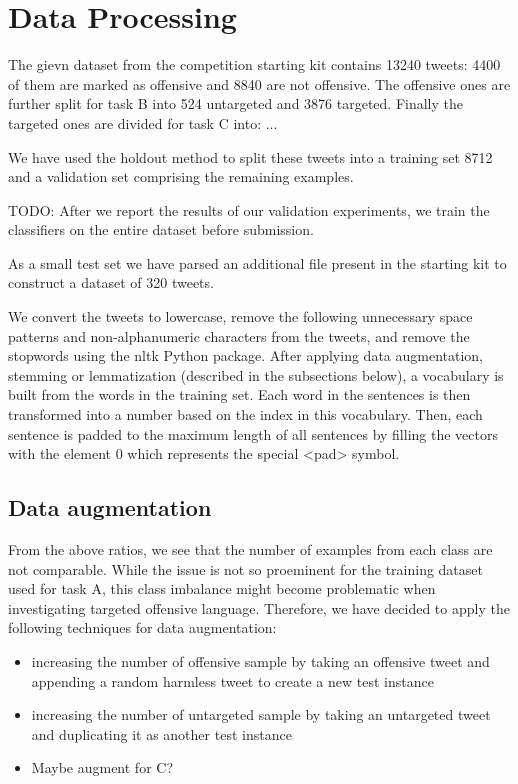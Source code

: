 \documentclass[11pt,a4paper]{article}
\begin{document}

\section{Data Processing}


The gievn dataset from the competition starting kit contains 13240 tweets: 4400 of them are marked as offensive and 8840 are not offensive. The offensive ones are further split for task B into 524 untargeted and 3876 targeted. Finally the targeted ones are divided for task C into: ...

We have used the holdout method to split these tweets into a training set 8712 and a validation set comprising the remaining examples. 

TODO: After we report the results of our validation experiments, we train the classifiers on the entire dataset before submission.

As a small test set we have parsed an additional file present in the starting kit to construct a dataset of 320 tweets.

We convert the tweets to lowercase, remove the following unnecessary space patterns and non-alphanumeric characters from the tweets, and remove the stopwords using the nltk Python package. After applying data augmentation, stemming or lemmatization (described in the subsections below), a vocabulary is built from the words in the training set. Each word in the sentences is then transformed into a number based on the index in this vocabulary. Then, each sentence is padded to the maximum length of all sentences by filling the vectors with the element 0 which represents the special <pad> symbol.

\subsection{Data augmentation}

From the above ratios, we see that the number of examples from each class are not comparable. While the issue is not so proeminent for the training dataset used for task A, this class imbalance might become problematic when investigating targeted offensive language. Therefore, we have decided to apply the following techniques for data augmentation:
\begin{itemize}
    \item increasing the number of offensive sample by taking an offensive tweet and appending a random harmless tweet to create a new test instance
    \item increasing the number of untargeted sample by taking an untargeted tweet and duplicating it as another test instance
    \item Maybe augment for C?
\end{itemize}
\end{document}
